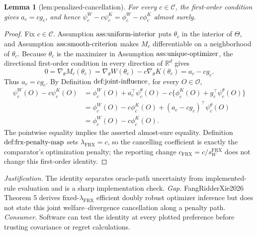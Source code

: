 \documentclass{article}
\newtheorem{lemma}{Lemma}
\begin{document}
\begin{lemma}[lem:penalized-cancellation]\label{lem:penalized-cancellation}
For every \(c\in\mathcal C\), the first-order condition gives \(a_c=cg_c\), and hence \(\psi^W_c-c\psi^K_c=\phi^W_c-c\phi^K_c\) almost surely.
\end{lemma}
\begin{proof}
Fix \(c\in\mathcal C\).  Assumption \(\textnormal{ass:uniform-interior}\) puts \(\theta_c\) in the interior of \(\Theta\), and Assumption \(\textnormal{ass:smooth-criterion}\) makes \(M_c\) differentiable on a neighborhood of \(\theta_c\).  Because \(\theta_c\) is the maximizer in Assumption \(\textnormal{ass:unique-optimizer}\), the directional first-order condition in every direction of \(\mathbb R^d\) gives
\[
 0=\nabla_\theta M_c(\theta_c)
  =\nabla_\theta W(\theta_c)-c\nabla_\theta K(\theta_c)
  =a_c-cg_c.
\]
Thus \(a_c=cg_c\).  By Definition \(\textnormal{def:joint-influence}\), for every \(O\in\mathcal O\),
\[
\begin{aligned}
 \psi_c^W(O)-c\psi_c^K(O)
 &=\phi_c^W(O)+a_c^\top\psi_c^\theta(O)
   -c\{\phi_c^K(O)+g_c^\top\psi_c^\theta(O)\}\\
 &=\phi_c^W(O)-c\phi_c^K(O)
   +(a_c-cg_c)^\top\psi_c^\theta(O)\\
 &=\phi_c^W(O)-c\phi_c^K(O).
\end{aligned}
\]
The pointwise equality implies the asserted almost-sure equality.  Definition \(\textnormal{def:frx-penalty-map}\) sets \(\lambda_{\mathrm{FRX}}=c\), so the cancelling coefficient is exactly the comparator's optimization penalty; the reporting change \(c_{\mathrm{FRX}}=c/s_W^{\mathrm{FRX}}\) does not change this first-order identity.
\end{proof}
\par\smallskip\noindent \textit{Justification.} The identity separates oracle-path uncertainty from implemented-rule evaluation and is a sharp implementation check. \textit{Gap.} FangRidderXie2026 Theorem 5 derives fixed-\(\lambda_{\mathrm{FRX}}\) efficient doubly robust optimizer inference but does not state this joint welfare--divergence cancellation along a penalty path. \textit{Consumer.} Software can test the identity at every plotted preference before trusting covariance or regret calculations.
\end{document}
